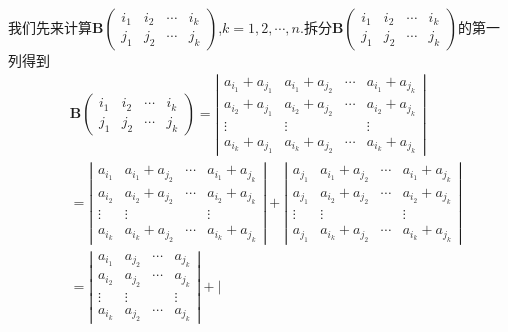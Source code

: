 \documentclass[../../main.tex]{subfiles}%
\begin{document}
\begin{solution}
\begin{enumerate}[(1)]
我们先来计算\(\boldsymbol{B}\left(\begin{matrix}
i_1 & i_2 & \cdots & i_k\\
j_1 & j_2 & \cdots & j_k
\end{matrix}\right)\),\(k = 1,2,\cdots,n\).拆分\(\boldsymbol{B}\left(\begin{matrix}
i_1 & i_2 & \cdots & i_k\\
j_1 & j_2 & \cdots & j_k
\end{matrix}\right)\)的第一列得到
\begin{align*}
&\boldsymbol{B}\left(\begin{matrix}
i_1 & i_2 & \cdots & i_k\\
j_1 & j_2 & \cdots & j_k
\end{matrix}\right) = \left|\begin{matrix}
a_{i_1} + a_{j_1} & a_{i_1} + a_{j_2} & \cdots & a_{i_1} + a_{j_k}\\
a_{i_2} + a_{j_1} & a_{i_2} + a_{j_2} & \cdots & a_{i_2} + a_{j_k}\\
\vdots & \vdots &  & \vdots\\
a_{i_k} + a_{j_1} & a_{i_k} + a_{j_2} & \cdots & a_{i_k} + a_{j_k}
\end{matrix}\right|
\\
&=\left|\begin{matrix}
a_{i_1} & a_{i_1} + a_{j_2} & \cdots & a_{i_1} + a_{j_k}\\
a_{i_2} & a_{i_2} + a_{j_2} & \cdots & a_{i_2} + a_{j_k}\\
\vdots & \vdots &  & \vdots\\
a_{i_k} & a_{i_k} + a_{j_2} & \cdots & a_{i_k} + a_{j_k}
\end{matrix}\right| + \left|\begin{matrix}
a_{j_1} & a_{i_1} + a_{j_2} & \cdots & a_{i_1} + a_{j_k}\\
a_{j_1} & a_{i_2} + a_{j_2} & \cdots & a_{i_2} + a_{j_k}\\
\vdots & \vdots &  & \vdots\\
a_{j_1} & a_{i_k} + a_{j_2} & \cdots & a_{i_k} + a_{j_k}
\end{matrix}\right|
\\
&=\left|\begin{matrix}
a_{i_1} & a_{j_2} & \cdots & a_{j_k}\\
a_{i_2} & a_{j_2} & \cdots & a_{j_k}\\
\vdots & \vdots &  & \vdots\\
a_{i_k} & a_{j_2} & \cdots & a_{j_k}
\end{matrix}\right| + \left|\begin{matrix}

\end{matrix}
\end{align*}
\end{enumerate}
\end{solution}
\end{document}
